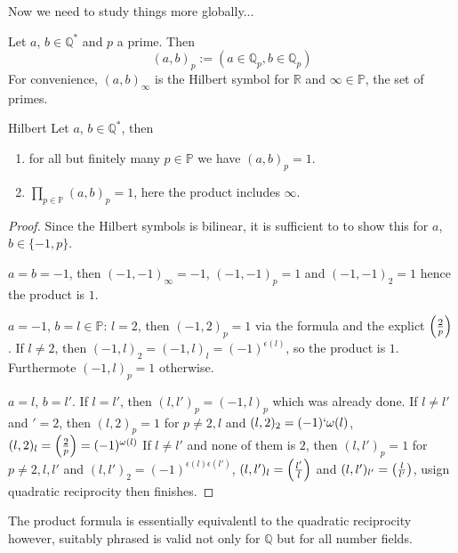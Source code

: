 Now we need to study things more globally...

\begin{definition}
  Let $a$, $b\in\mathbb Q^*$ and $p$ a prime. Then
  $$(a,b)_p := (a \in\mathbb Q_p, b \in \mathbb Q_p)$$
  For convenience, $(a, b)_\infty$ is the Hilbert symbol for $\mathbb R$
  and $\infty \in\mathbb P$, the set of primes.
\end{definition}

\begin{theorem}{Hilbert}
  Let $a$, $b\in \mathbb Q^*$, then
  \begin{enumerate}
    \item for all but finitely many $p\in\mathbb P$ we have $(a, b)_p = 1$.
    \item $\prod_{p\in\mathbb P} (a,b)_p = 1$, here the product includes
      $\infty$.
  \end{enumerate}
\end{theorem}
\begin{proof}
  Since the Hilbert symbols is bilinear, it is sufficient to to show this
  for $a$, $b\in\{-1, p\}$.

  $a=b=-1$, then $(-1, -1)_\infty = -1$, $(-1, -1)_p = 1$ and $(-1, -1)_2 = 1$
  hence the product is $1$.

  $a=-1$, $b=l\in \mathbb P$: $l=2$, then $(-1, 2)_p = 1$ via the formula and
  the explict $\left(\frac{2}{p}\right)$. If $l\ne 2$, then $(-1, l)_2 = (-1, l)_l = (-1)^{\epsilon(l)}$, so the product is $1$. Furthermote $(-1, l)_p = 1$ otherwise.

  $a=l$, $b=l'$. If $l=l'$, then $(l, l')_p = (-1, l)_p$ which was already done.
  If $l\ne l'$ and $' = 2$, then $(l, 2)_p = 1$ for $p\ne 2, l$ and
  $(l, 2)_2 = (-1)`{\omega(l)}$, $(l, 2)_l = \left(\frac{2}{p}\right) = (-1)^{\omega(l)}$
  If $l\ne l'$ and none of them is $2$, then $(l, l')_p = 1$ for $p\ne 2, l, l'$
  and $(l, l')_2 = (-1)^{\epsilon(l)\epsilon(l')}$, 
  $(l, l')_l = \left(\frac{l'}{l}\right)$ and
  $(l, l')_{l'} = \left(\frac{l}{l'}\right)$, usign quadratic reciprocity then finishes.
\end{proof}

\begin{remark}
  The product formula is essentially equivalentl to the quadratic reciprocity
  however, suitably phrased is valid not only for $\mathbb Q$ but for all
  number fields.
\end{remark}

